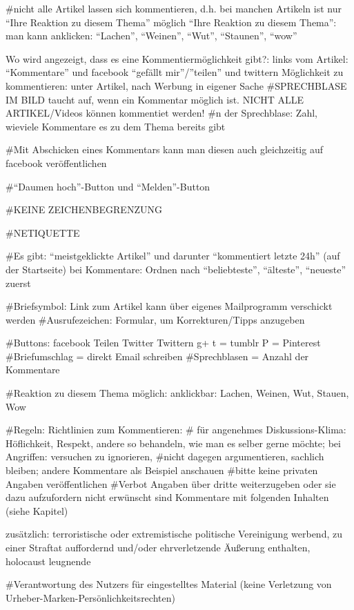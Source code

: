 #nicht alle Artikel lassen sich kommentieren, d.h. bei manchen Artikeln ist nur ``Ihre Reaktion zu diesem Thema'' möglich 
``Ihre Reaktion zu diesem Thema'': man kann anklicken: ``Lachen'', ``Weinen'', ``Wut'', ``Staunen'', ``wow''


Wo wird angezeigt, dass es eine Kommentiermöglichkeit gibt?: links vom Artikel: ``Kommentare'' und facebook ``gefällt mir''/''teilen'' und twittern 
Möglichkeit zu kommentieren: unter Artikel, nach Werbung in eigener Sache
#SPRECHBLASE IM BILD taucht auf, wenn ein Kommentar möglich ist. NICHT ALLE ARTIKEL/Videos können kommentiet werden! 
#n der Sprechblase: Zahl, wieviele Kommentare es zu dem Thema bereits gibt

#Mit Abschicken eines Kommentars kann man diesen auch gleichzeitig auf facebook veröffentlichen

#``Daumen hoch''-Button und ``Melden''-Button


#KEINE ZEICHENBEGRENZUNG

#NETIQUETTE

#Es gibt: ``meistgeklickte Artikel'' und darunter ``kommentiert letzte 24h'' (auf der Startseite)
bei Kommentare: Ordnen nach ``beliebteste'', ``älteste'', ``neueste'' zuerst

#Briefsymbol: Link zum Artikel kann über eigenes Mailprogramm verschickt werden
#Ausrufezeichen: Formular, um Korrekturen/Tipps anzugeben

#Buttons:
facebook Teilen
Twitter Twittern
g+
t = tumblr
P = Pinterest
#Briefumschlag = direkt Email schreiben
#Sprechblasen = Anzahl der Kommentare


#Reaktion zu diesem Thema möglich: anklickbar: Lachen, Weinen, Wut, Stauen, Wow


#Regeln: Richtlinien zum Kommentieren:
#	für angenehmes Diskussions-Klima: Höflichkeit, Respekt, andere so behandeln, wie man es selber gerne möchte; bei Angriffen: versuchen zu ignorieren, #nicht 			dagegen argumentieren, sachlich bleiben; andere Kommentare als Beispiel anschauen
	#bitte keine privaten Angaben veröffentlichen
	#Verbot Angaben über dritte weiterzugeben oder sie dazu aufzufordern
	nicht erwünscht sind Kommentare mit folgenden Inhalten (siehe Kapitel)
	
	zusätzlich: terroristische oder extremistische politische Vereinigung werbend, zu einer Straftat auffordernd und/oder ehrverletzende Äußerung enthalten, holocaust leugnende


	#Verantwortung des Nutzers für eingestelltes Material (keine Verletzung von Urheber-Marken-Persönlichkeitsrechten)

